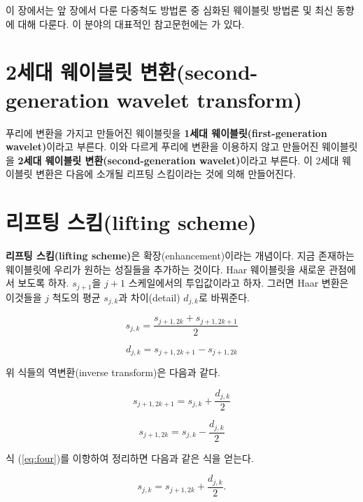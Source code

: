 \documentclass[b5paper,]{scrbook}
\theoremstyle{plain}
\theoremstyle{definition}
\numberwithin{equation}{section}
\begin{document}
이 장에서는 앞 장에서 다룬 다중척도 방법론 중 심화된 웨이블릿 방법론 및 최신 동향에 대해 다룬다. 이 분야의 대표적인 참고문헌에는 \citep{Jansen2005}가 있다.

\hypertarget{--second-generation-wavelet-transform}{%
\section{2세대 웨이블릿 변환(second-generation wavelet transform)}\label{--second-generation-wavelet-transform}}

푸리에 변환을 가지고 만들어진 웨이블릿을 \textbf{1세대 웨이블릿(first-generation wavelet)}이라고 부른다. 이와 다르게 푸리에 변환을 이용하지 않고 만들어진 웨이블릿을 \textbf{2세대 웨이블릿 변환(second-generation wavelet)}이라고 부른다. 이 2세대 웨이블릿 변환은 다음에 소개될 리프팅 스킴이라는 것에 의해 만들어진다.

\hypertarget{-lifting-scheme}{%
\section{리프팅 스킴(lifting scheme)}\label{-lifting-scheme}}

\textbf{리프팅 스킴(lifting scheme)}은 확장(enhancement)이라는 개념이다. 지금 존재하는 웨이블릿에 우리가 원하는 성질들을 추가하는 것이다. Haar 웨이블릿을 새로운 관점에서 보도록 하자. \(s_{j+1}\)을 \(j+1\) 스케일에서의 투입값이라고 하자. 그러면 Haar 변환은 이것들을 \(j\) 척도의 평균 \(s_{j,k}\)과 차이(detail) \(d_{j,k}\)로 바꿔준다.

\begin{equation}
    s_{j,k}=\frac{s_{j+1,2k}+s_{j+1,2k+1}}{2}
\end{equation}

\begin{equation}
    d_{j,k}=s_{j+1,2k+1}-s_{j+1,2k}
\end{equation}

위 식들의 역변환(inverse transform)은 다음과 같다.

\begin{equation}
    s_{j+1,2k+1}=s_{j,k}+\frac{d_{j,k}}{2}
\end{equation}

\begin{equation}
    s_{j+1,2k}=s_{j,k}-\frac{d_{j,k}}{2}
    \label{eq:four}
\end{equation}

식 (\eqref{eq:four})를 이항하여 정리하면 다음과 같은 식을 얻는다.

\begin{equation}
    s_{j,k}=s_{j+1,2k}+\frac{d_{j,k}}{2}.
\end{equation}
\end{document}
